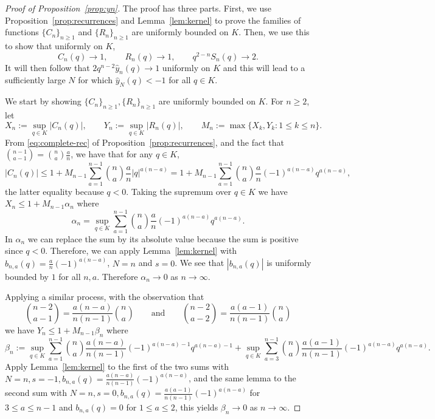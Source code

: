 \documentclass[10pt,a4paper]{amsart}
\begin{document}
\begin{proof}[Proof of Proposition~\ref{prop:yn}]
The proof has three parts. First, we use Proposition~\ref{prop:recurrences} and Lemma~\ref{lem:kernel} to prove the families of functions $\{C_n\}_{n \geq 1}$ and $\{R_n\}_{n \geq 1}$ are uniformly bounded on $K$. Then, we use this to show that uniformly on $K$, 
\[
C_n(q) \to 1, \qquad R_n(q) \to 1, \qquad q^{2-n}S_n(q) \to 2.
\]
It will then follow that $2q^{n-2}\hat{y}_n(q) \to 1$ uniformly on $K$ and this will lead to a sufficiently large $N$ for which $\hat{y}_N(q)<-1$ for all $q \in K$.

We start by showing $\{C_n\}_{n \geq 1},\{R_n\}_{n \geq 1}$ are uniformly bounded on $K$. For $n \geq 2$, let
\[
X_n:=\sup_{q \in K} |C_n(q)|, \qquad Y_n:=\sup_{q \in K} |R_n(q)|, \qquad M_n:=\max\{X_k,Y_k \colon 1 \leq k \leq n\}.
\]
From \eqref{eq:complete-rec} of Proposition~\ref{prop:recurrences}, and the fact that $\binom{n-1}{a-1}=\binom{n}{a}\frac{a}{n}$, we have that for any $q \in K$,
\[
|C_n(q)| \leq 1 + M_{n-1} \sum_{a=1}^{n-1} \binom{n}{a} \frac{a}{n} |q|^{a(n-a)}=1+M_{n-1}\sum_{a=1}^{n-1} \binom{n}{a} \frac{a}{n} (-1)^{a(n-a)} q^{a(n-a)},
\]
the latter equality because $q<0$. Taking the supremum over $q \in K$ we have $X_n \leq 1+M_{n-1}\alpha_n$ where 
\[
\alpha_n=\sup_{q \in K} \sum_{a=1}^{n-1} \binom{n}{a} \frac{a}{n} (-1)^{a(n-a)} q^{a(n-a)}.
\] 
In $\alpha_n$ we can replace the sum by its absolute value because the sum is positive since $q<0$. Therefore, we can apply  Lemma~\ref{lem:kernel} with $b_{n,a}(q)=\frac{a}{n}(-1)^{a(n-a)}$, $N=n$ and $s=0$. We see that $|b_{n,a}(q)|$ is uniformly bounded by $1$ for all $n,a$. Therefore $\alpha_n \to 0$ as $n \to \infty$.

Applying a similar process, with the observation that 
\[
\binom{n-2}{a-1}=\frac{a(n-a)}{n(n-1)}\binom{n}{a} \qquad{ \text{and} } \qquad \binom{n-2}{a-2}=\frac{a(a-1)}{n(n-1)}\binom{n}{a}
\]
we have $Y_n \leq 1+M_{n-1}\beta_n$ where
\[
\beta_n := \sup_{q \in K} \sum_{a=1}^{n-1} \binom{n}{a}\frac{a(n-a)}{n(n-1)}(-1)^{a(n-a)-1} q^{a(n-a)-1} + \sup_{q \in K} \sum_{a=3}^{n-1} \binom{n}{a}\frac{a(a-1)}{n(n-1)}(-1)^{a(n-a)} q^{a(n-a)}. 
\]
Apply Lemma~\ref{lem:kernel} to the first of the two sums with $N=n,s=-1,b_{n,a}(q)=\frac{a(n-a)}{n(n-1)}(-1)^{a(n-a)}$, and the same lemma to the second sum with $N=n,s=0,b_{n,a}(q)=\frac{a(a-1)}{n(n-1)}(-1)^{a(n-a)}$ for $3 \leq a \leq n-1$ and $b_{n,a}(q)=0$ for $1 \leq a \leq 2$, this yields $\beta_n \to 0$ as $n \to \infty$.


\end{proof}
\end{document}
